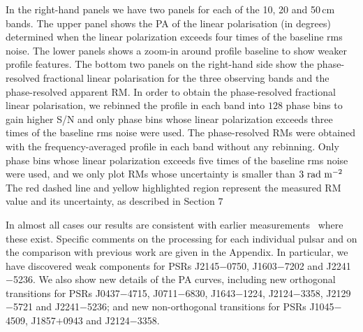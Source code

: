 \documentclass[useAMS,usenatbib]{mn2e}
\begin{document}
In the right-hand panels we have two panels for each of the 10, 20 and 50\,cm bands. The upper 
panel shows the PA of the linear polarisation (in degrees) determined when the 
linear polarization exceeds four times of the baseline rms noise.  
%
The lower panels shows a zoom-in around profile baseline to show weaker profile features. 
%
The bottom two panels on the right-hand side show the phase-resolved fractional linear polarisation 
for the three observing bands and the phase-resolved apparent RM.
%
In order to obtain the phase-resolved fractional linear polarisation, we rebinned the profile 
in each band into $128$ phase bins to gain higher S/N and only phase bins whose linear polarization 
exceeds three times of the baseline rms noise were used. 
%
The phase-resolved RMs were obtained with the frequency-averaged profile in each band 
without any rebinning. Only phase bins whose linear polarization exceeds five times of the 
baseline rms noise were used, and we only plot RMs whose uncertainty is smaller than 
$3\ \rm{rad\ m^{-2}}$
%
The red dashed line and yellow highlighted region represent the measured RM value and its 
uncertainty, as described in Section $7$

In almost all cases our results are consistent with earlier measurements~\citep[such as][]{Ord04,Yan11}
where these exist.
%
Specific comments on the processing for each individual pulsar and on the comparison with 
previous work are given in the Appendix.   
%
In particular, we have discovered weak components for PSRs J2145$-$0750, J1603$-$7202 and 
J2241$-$5236. We also show new details of the PA curves, including new orthogonal 
transitions for PSRs J0437$-$4715, J0711$-$6830, J1643$-$1224, J2124$-$3358, 
J2129$-$5721 and J2241$-$5236; and new non-orthogonal transitions for PSRs J1045$-$4509, 
J1857$+$0943 and J2124$-$3358.

%
%
%
%
\end{document}
